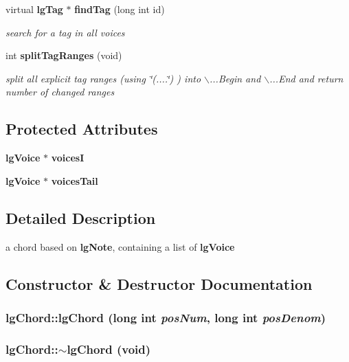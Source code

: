 \begin{CompactItemize}
virtual {\bf lg\-Tag} $\ast$ {\bf find\-Tag} (long int id)
\begin{CompactList}\small\item\em search for a tag in all voices \item\end{CompactList}\item 
int {\bf split\-Tag\-Ranges} (void)
\begin{CompactList}\small\item\em split all explicit tag ranges (using \char`\"{}(....\char`\"{}) ) into $\backslash$...Begin and $\backslash$...End and return number of changed ranges \item\end{CompactList}\end{CompactItemize}
\subsection*{Protected Attributes}
\begin{CompactItemize}
\item 
{\bf lg\-Voice} $\ast$ {\bf voices\-I}
\item 
{\bf lg\-Voice} $\ast$ {\bf voices\-Tail}
\end{CompactItemize}


\subsection{Detailed Description}
a chord based on {\bf lg\-Note}, containing a list of {\bf lg\-Voice} 



\subsection{Constructor \& Destructor Documentation}
\subsubsection{\setlength{\rightskip}{0pt plus 5cm}lg\-Chord::lg\-Chord (long int {\em pos\-Num}, long int {\em pos\-Denom})}\label{classlgChord_a1}


\subsubsection{\setlength{\rightskip}{0pt plus 5cm}lg\-Chord::$\sim${\bf lg\-Chord} (void)\hspace{0.3cm}{\tt  [virtual]}}\label{classlgChord_a2}




